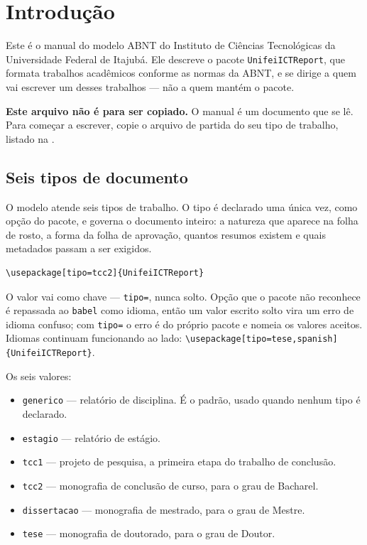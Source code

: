 \chapter{Introdução}\label{cap:introducao}

Este é o manual do modelo ABNT do Instituto de Ciências Tecnológicas da Universidade Federal de
Itajubá. Ele descreve o pacote \texttt{UnifeiICTReport}, que formata trabalhos acadêmicos conforme
as normas da ABNT, e se dirige a quem vai escrever um desses trabalhos --- não a quem mantém o
pacote.

\textbf{Este arquivo não é para ser copiado.} O manual é um documento que se lê. Para começar a
escrever, copie o arquivo de partida do seu tipo de trabalho, listado na
.

\section{Seis tipos de documento}\label{sec:seis-tipos}

O modelo atende seis tipos de trabalho. O tipo é declarado uma única vez, como opção do pacote, e
governa o documento inteiro: a natureza que aparece na folha de rosto, a forma da folha de
aprovação, quantos resumos existem e quais metadados passam a ser exigidos.

\begin{Verbatim}[fontsize=\small]
\usepackage[tipo=tcc2]{UnifeiICTReport}
\end{Verbatim}

O valor vai como chave --- \texttt{tipo=}, nunca solto. Opção que o pacote não reconhece é
repassada ao \texttt{babel} como idioma, então um valor escrito solto vira um erro de idioma
confuso; com \texttt{tipo=} o erro é do próprio pacote e nomeia os valores aceitos. Idiomas
continuam funcionando ao lado: \texttt{\textbackslash usepackage[tipo=tese,spanish]\{UnifeiICTReport\}}.

Os seis valores:

\begin{itemize}
    \item \texttt{generico} --- relatório de disciplina. É o padrão, usado quando nenhum tipo é
          declarado.
    \item \texttt{estagio} --- relatório de estágio.
    \item \texttt{tcc1} --- projeto de pesquisa, a primeira etapa do trabalho de conclusão.
    \item \texttt{tcc2} --- monografia de conclusão de curso, para o grau de Bacharel.
    \item \texttt{dissertacao} --- monografia de mestrado, para o grau de Mestre.
    \item \texttt{tese} --- monografia de doutorado, para o grau de Doutor.
\end{itemize}

